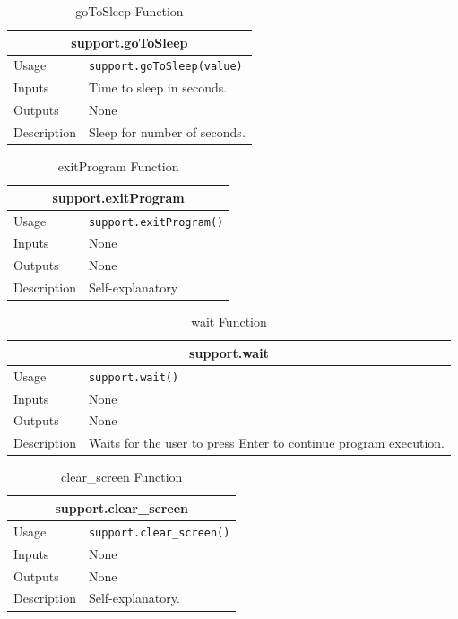 \documentclass{llncs}
\numberwithin{algorithm}{chapter}
\begin{document}
\begin{table}[H]
\caption{goToSleep Function}
\begin{tabular}{ |p{2cm}||p{11cm}|  }
 \hline
 \multicolumn{2}{|c|}{\cellcolor{teal}\textbf{support.goToSleep}} \\
 \hline
 Usage & \texttt{support.goToSleep(value)}\\ \hline
 Inputs & Time to sleep in seconds. \\ \hline
 Outputs &  None \\ \hline
 Description & Sleep for number of seconds. \\ \hline
\end{tabular}
\end{table}

\begin{table}[H]
\caption{exitProgram Function}
\begin{tabular}{ |p{2cm}||p{11cm}|  }
 \hline
 \multicolumn{2}{|c|}{\cellcolor{teal}\textbf{support.exitProgram}} \\
 \hline
 Usage & \texttt{support.exitProgram()}\\ \hline
 Inputs & None \\ \hline
 Outputs &  None \\ \hline
 Description & Self-explanatory \\ \hline
\end{tabular}
\end{table}

\begin{table}[H]
\caption{wait Function}
\begin{tabular}{ |p{2cm}||p{11cm}|  }
 \hline
 \multicolumn{2}{|c|}{\cellcolor{teal}\textbf{support.wait}} \\
 \hline
 Usage & \texttt{support.wait()}\\ \hline
 Inputs & None \\ \hline
 Outputs &  None \\ \hline
 Description & Waits for the user to press Enter to continue program execution. \\ \hline
\end{tabular}
\end{table}


\begin{table}[H]
\caption{clear\_screen Function}
\begin{tabular}{ |p{2cm}||p{11cm}|  }
 \hline
 \multicolumn{2}{|c|}{\cellcolor{teal}\textbf{support.clear\_screen}} \\
 \hline
 Usage & \texttt{support.clear\_screen()}\\ \hline
 Inputs & None \\ \hline
 Outputs &  None \\ \hline
 Description & Self-explanatory. \\ \hline
\end{tabular}
\end{table}
\end{document}
